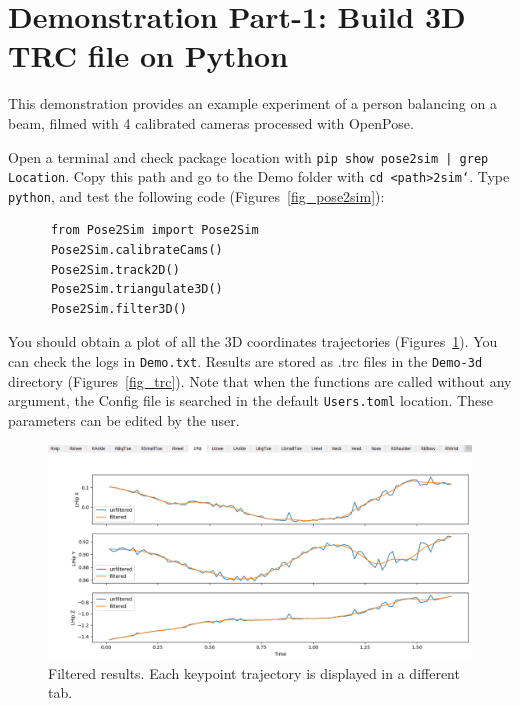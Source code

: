 \newpage
\section{Demonstration Part-1: Build 3D TRC file on Python}

This demonstration provides an example experiment of a person balancing on a beam, filmed with 4 calibrated cameras processed with OpenPose.

Open a terminal and check package location with  \texttt{pip show pose2sim | grep Location}. \newline
Copy this path and go to the Demo folder with  \texttt{cd <path>\pose2sim\Demo`}. \newline
Type \texttt{python}, and test the following code (Figures~\ref{fig_pose2sim}):
\begin{verbatim}
      from Pose2Sim import Pose2Sim
      Pose2Sim.calibrateCams()
      Pose2Sim.track2D()
      Pose2Sim.triangulate3D()
      Pose2Sim.filter3D()
\end{verbatim}

You should obtain a plot of all the 3D coordinates trajectories (Figures~\ref{fig_filterplot}). You can check the logs in \texttt{Demo\Users\logs.txt}. Results are stored as .trc files in the \texttt{Demo\pose-3d} directory (Figures~\ref{fig_trc}). Note that when the functions are called without any argument, the Config file is searched in the default \texttt{Users\Config.toml} location. These parameters can be edited by the user.

\begin{figure}[hbtp]
	\centering
	\def\svgwidth{1\columnwidth}
	\fontsize{10pt}{10pt}\selectfont
	\includegraphics[width=0.75\linewidth]{"../Chap3/Figures/Fig_FilterPlot.png"}
	\caption{Filtered results. Each keypoint trajectory is displayed in a different tab.}
	\label{fig_filterplot}
\end{figure}

